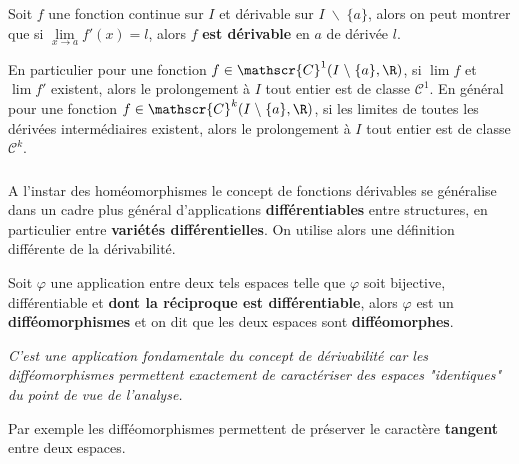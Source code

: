 \subsection*{}
Soit \(f\) une fonction continue sur \(I\) et dérivable sur \(I \; \backslash \; \{a\}\), alors on peut montrer que si \(\underset{x \rightarrow a}{\lim} f'(x) =  l\), alors \(f\) \textbf{est dérivable} en \(a\) de dérivée \(l\).\<

En particulier pour une fonction \(f \in \mathscr{C}^1(I \; \backslash \; \{a\}, \R)\), si \({\lim}f\) et \({\lim}f'\) existent, alors le prolongement à \(I\) tout entier est de classe \(\mathscr{C}^1\).\+
En général pour une fonction \(f \in \mathscr{C}^k(I \; \backslash \; \{a\}, \R)\), si les limites de toutes les dérivées intermédiaires existent, alors le prolongement à \(I\) tout entier est de classe \(\mathscr{C}^k\).

\subsection*{}
A l'instar des homéomorphismes le concept de fonctions dérivables se généralise dans un cadre plus général d'applications \textbf{différentiables} entre structures, en particulier entre \textbf{variétés différentielles}. On utilise alors une définition différente de la dérivabilité.\<

Soit \(\varphi\) une application entre deux tels espaces telle que \(\varphi\) soit bijective, différentiable et \textbf{dont la réciproque est différentiable}, alors \(\varphi\) est un \textbf{difféomorphismes} et on dit que les deux espaces sont \textbf{difféomorphes}.
\begin{center}
   \textit{
      C'est une application fondamentale du concept de dérivabilité car les difféomorphismes permettent exactement de caractériser des espaces "identiques" du point de vue de l'analyse.
   }
\end{center}
Par exemple les difféomorphismes permettent de préserver le caractère \textbf{tangent} entre deux espaces.

\chapter*{}
